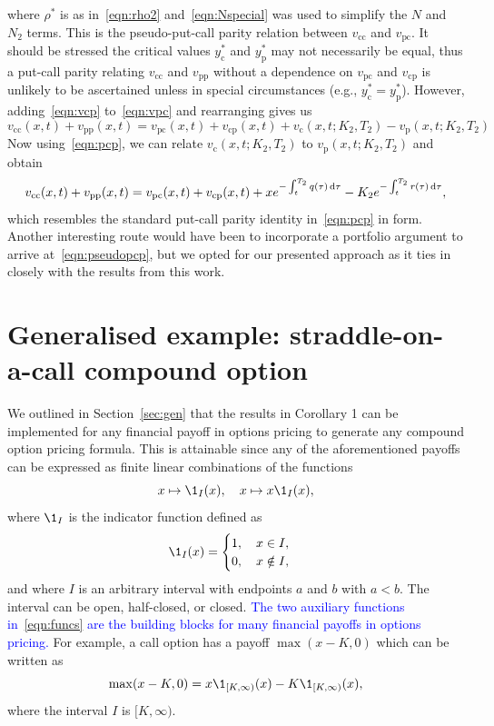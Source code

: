 where $\rho^*$ is as in~\eqref{eqn:rho2} and~\eqref{eqn:Nspecial} was used to simplify the $N$ and $N_2$ terms. This is the pseudo-put-call parity relation between $v_\text{cc}$ and $v_\text{pc}$. It should be stressed the critical values $y_\text{c}^*$ and $y_\text{p}^*$ may not necessarily be equal, thus a put-call parity relating $v_\text{cc}$ and $v_\text{pp}$ without a dependence on $v_\text{pc}$ and $v_\text{cp}$ is unlikely to be ascertained unless in special circumstances (e.g., $y_\text{c}^* = y_\text{p}^*$). However, adding~\eqref{eqn:vcp} to~\eqref{eqn:vpc} and rearranging gives us
	\begin{equation*}
		v_\text{cc}(x,t) + v_\text{pp}(x,t) = v_\text{pc}(x,t) + v_\text{cp}(x,t) + v_\text{c}(x,t; K_2, T_2) - v_\text{p}(x,t; K_2, T_2)
	\end{equation*}
Now using~\eqref{eqn:pcp}, we can relate $v_\text{c}(x,t; K_2, T_2)$ to $v_\text{p}(x,t; K_2, T_2)$ and obtain
	\begin{equation}
		\label{eqn:pseudopcp}
		v_\text{cc}(x,t) + v_\text{pp}(x,t) =  v_\text{pc}(x,t) + v_\text{cp}(x,t) + xe^{-\int_t^{T_2} q(\tau) \, \mathrm d\tau} - K_2e^{-\int_t^{T_2} r(\tau) \, \mathrm d\tau},
	\end{equation}
which resembles the standard put-call parity identity in~\eqref{eqn:pcp} in form. Another interesting route would have been to incorporate a portfolio argument to arrive at~\eqref{eqn:pseudopcp}, but we opted for our presented approach as it ties in closely with the results from this work.

\section{Generalised example: straddle-on-a-call compound option}
We outlined in Section~\ref{sec:gen} that the results in Corollary 1 can be implemented for any financial payoff in options pricing to generate any compound option pricing formula. This is attainable since any of the aforementioned payoffs can be expressed as finite linear combinations of the functions
	\begin{equation}
		\label{eqn:funcs}
		x \mapsto \1_I(x), \quad x \mapsto x\1_I(x),
	\end{equation}
where $\1_I$ is the indicator function defined as
	\begin{equation*}
		\1_I(x) = \begin{cases}
			1, \quad x \in I, \\
			0, \quad x \notin I,
		\end{cases}
	\end{equation*}
and where $I$ is an arbitrary interval with endpoints $a$ and $b$ with $a < b$. The interval can be open, half-closed, or closed. \textcolor{blue}{The two auxiliary functions in~\eqref{eqn:funcs} are the building blocks for many financial payoffs in options pricing.} For example, a call option has a payoff $\max(x-K,0)$ which can be written as
	\begin{equation*}
		\max(x-K,0) = x\1_{[K,\infty)}(x) - K\1_{[K,\infty)}(x),
	\end{equation*}
where the interval $I$ is $[K,\infty)$.

